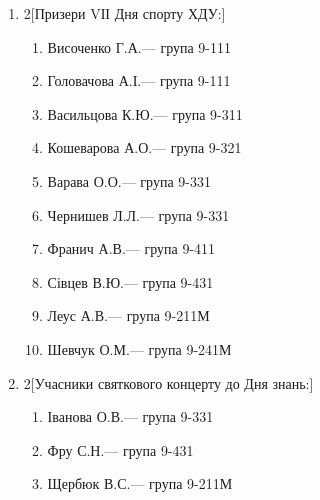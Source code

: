 \documentclass[
	a4paper,
	12pt,
	oneside,
	draft
]{extreport}
\begin{document}
{\begin{enumerate}[label=\Roman*.]
\item \begin{multicols}{2}[Призери VІІ Дня спорту ХДУ:]
\begin{enumerate}[topsep=0pt,itemsep=-1ex,partopsep=1ex,parsep=1ex,label=\arabic*.]
\item Височенко Г.А.\hfill --- група 9-111
\item Головачова А.І.\hfill --- група 9-111
\item Васильцова К.Ю.\hfill --- група 9-311
\item Кошеварова А.О.\hfill --- група 9-321
\item Варава О.О.\hfill --- група 9-331
\item Чернишев Л.Л.\hfill --- група 9-331
\item Франич А.В.\hfill --- група 9-411
\item Сівцев В.Ю.\hfill --- група 9-431
\item Леус А.В.\hfill --- група 9-211М
\item Шевчук О.М.\hfill --- група 9-241М
\end{enumerate}
\end{multicols}


\item \begin{multicols}{2}[Учасники святкового концерту до Дня знань:]
\begin{enumerate}[topsep=0pt,itemsep=-1ex,partopsep=1ex,parsep=1ex,label=\arabic*.]
\item Іванова О.В.\hfill --- група 9-331
\item Фру С.Н.\hfill --- група 9-431
\item Щербюк В.С.\hfill --- група 9-211М
\end{enumerate}
\end{multicols}



\end{enumerate}}
\end{document}
